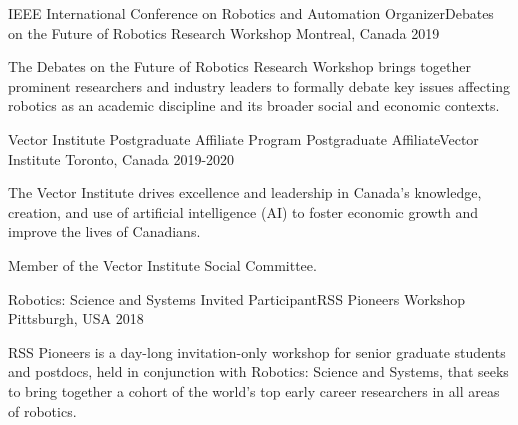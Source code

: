 

\begin{cventries} 

  \cventry
    {IEEE International Conference on Robotics and Automation} %
    {Organizer{\enskip\cdotp\enskip}Debates on the Future of Robotics Research Workshop} %
    {Montreal, Canada} %
    {2019} %
    {
      \begin{cvitems} %
        \item {The Debates on the Future of Robotics Research Workshop brings together prominent researchers and industry leaders to formally debate key issues affecting robotics as an academic discipline and its broader social and economic contexts.}
      \end{cvitems}
    }
    
  \cventry
    {Vector Institute Postgraduate Affiliate Program} %
    {Postgraduate Affiliate{\enskip\cdotp\enskip}Vector Institute} %
    {Toronto, Canada} %
    {2019-2020} %
    {
      \begin{cvitems} %
        \item {The Vector Institute drives excellence and leadership in Canada’s knowledge, creation, and use of artificial intelligence (AI) to foster economic growth and improve the lives of Canadians.}
        \item Member of the Vector Institute Social Committee.
      \end{cvitems}
    }
    
  \cventry
    {Robotics: Science and Systems} %
    {Invited Participant{\enskip\cdotp\enskip}RSS Pioneers Workshop} %
    {Pittsburgh, USA} %
    {2018} %
    {
      \begin{cvitems} %
        \item {RSS Pioneers is a day-long invitation-only workshop for senior graduate students and postdocs, held in conjunction with Robotics: Science and Systems, that seeks to bring together a cohort of the world’s top early career researchers in all areas of robotics.}
      \end{cvitems}
    }
    

\end{cventries}
